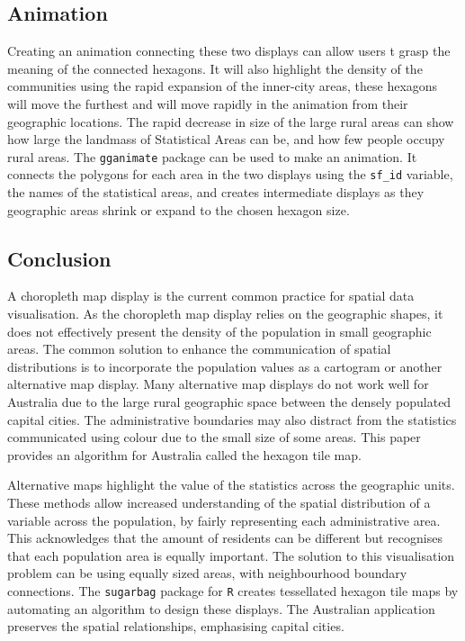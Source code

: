 \hypertarget{animation}{%
\subsection{Animation}\label{animation}}

Creating an animation connecting these two displays can allow users t
grasp the meaning of the connected hexagons. It will also highlight the
density of the communities using the rapid expansion of the inner-city
areas, these hexagons will move the furthest and will move rapidly in
the animation from their geographic locations. The rapid decrease in
size of the large rural areas can show how large the landmass of
Statistical Areas can be, and how few people occupy rural areas. The
\texttt{gganimate} \citep{gganimate} package can be used to make an
animation. It connects the polygons for each area in the two displays
using the \texttt{sf\_id} variable, the names of the statistical areas,
and creates intermediate displays as they geographic areas shrink or
expand to the chosen hexagon size.

\hypertarget{conclusion-03}{%
\subsection{Conclusion}\label{conclusion-03}}

A choropleth map display is the current common practice for spatial data
visualisation. As the choropleth map display relies on the geographic
shapes, it does not effectively present the density of the population in
small geographic areas. The common solution to enhance the communication
of spatial distributions is to incorporate the population values as a
cartogram or another alternative map display. Many alternative map
displays do not work well for Australia due to the large rural
geographic space between the densely populated capital cities. The
administrative boundaries may also distract from the statistics
communicated using colour due to the small size of some areas. This
paper provides an algorithm for Australia called the hexagon tile map.

Alternative maps highlight the value of the statistics across the
geographic units. These methods allow increased understanding of the
spatial distribution of a variable across the population, by fairly
representing each administrative area. This acknowledges that the amount
of residents can be different but recognises that each population area
is equally important. The solution to this visualisation problem can be
using equally sized areas, with neighbourhood boundary connections. The
\texttt{sugarbag} package for \texttt{R} creates tessellated hexagon
tile maps by automating an algorithm to design these displays. The
Australian application preserves the spatial relationships, emphasising
capital cities.

